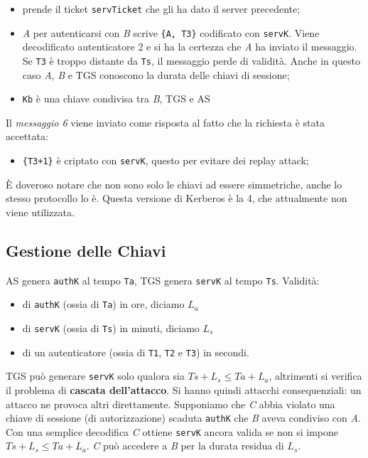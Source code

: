 \begin{itemize}
      \item prende il ticket \verb|servTicket| che gli ha dato il
            server precedente;
      \item \textit{A} per autenticarsi con \textit{B} scrive \verb|{A, T3}|
            codificato con \verb|servK|. Viene decodificato
            autenticatore 2 e si ha la certezza che \textit{A} ha inviato il
            messaggio. Se \verb|T3| è troppo distante da \verb|Ts|,
            il messaggio perde di validità. Anche in questo
            caso \textit{A}, \textit{B} e TGS conoscono la durata delle chiavi
            di sessione;
      \item \verb|Kb| è una chiave condivisa tra \textit{B}, TGS e AS
\end{itemize}

Il \textit{messaggio 6} viene inviato come risposta al fatto che la richiesta è
stata accettata:

\begin{itemize}
      \item \verb|{T3+1}| è criptato con \verb|servK|,
            questo per evitare dei replay attack;
\end{itemize}

È doveroso notare che non sono solo le chiavi ad essere simmetriche,
anche lo stesso protocollo lo è.
Questa versione di Kerberos è la 4, che attualmente non viene utilizzata.

\subsection{Gestione delle Chiavi}

AS genera \verb|authK| al tempo \verb|Ta|, TGS genera \verb|servK| al
tempo \verb|Ts|.
Validità:

\begin{itemize}
      \item di \verb|authK| (ossia di \verb|Ta|) in ore, diciamo \(L_a\)
      \item di \verb|servK| (ossia di \verb|Ts|) in minuti, diciamo \(L_s\)
      \item di un autenticatore (ossia di \verb|T1|, \verb|T2| e \verb|T3|) in
            secondi.
\end{itemize}

TGS può generare \verb|servK| solo qualora sia \(Ts + L_s \le Ta + L_a\),
altrimenti si verifica il problema di \textbf{cascata dell'attacco}. Si hanno
quindi attacchi consequenziali: un attacco ne provoca altri direttamente.
Supponiamo che \textit{C} abbia violato una chiave di sessione (di autorizzazione)
scaduta \verb|authK| che \textit{B} aveva condiviso con \textit{A}.
Con una semplice decodifica \textit{C} ottiene \verb|servK| ancora valida
se non si impone \(Ts + L_s \le Ta + L_a\). \textit{C} può accedere a \textit{B}
per la durata residua di \(L_s\).

